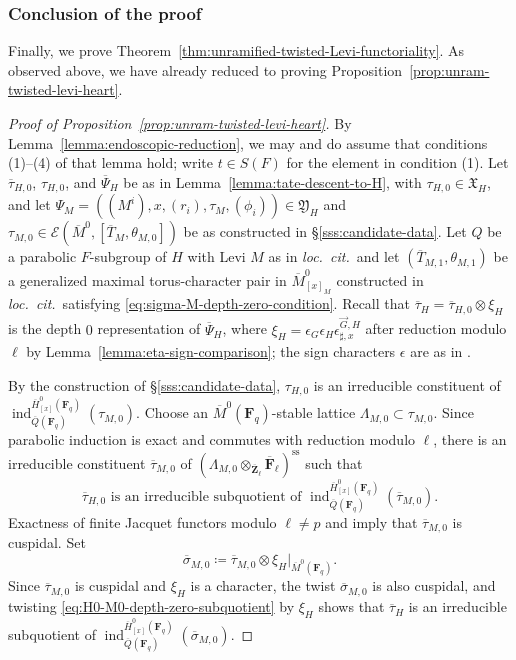 \documentclass[reqno]{amsart}
\numberwithin{equation}{subsection}
\newcommand{\F}{\mathbf{F}}
\newcommand{\Z}{\mathbf{Z}}
\newcommand{\ol}[1]{\overline{#1}}
\newcommand\cE{\mathcal{E}}
\DeclareMathOperator{\ind}{ind}
\theoremstyle{remark}
\numberwithin{equation}{subsection}
\numberwithin{figure}{subsection}
\begin{document}
\subsubsection{Conclusion of the proof}

Finally, we prove Theorem~\ref{thm:unramified-twisted-Levi-functoriality}. As observed above, we have already reduced to proving Proposition~\ref{prop:unram-twisted-levi-heart}.

\begin{proof}[Proof of Proposition~\ref{prop:unram-twisted-levi-heart}]
By Lemma~\ref{lemma:endoscopic-reduction}, we may and do assume that conditions (1)--(4) of that lemma hold; write $t \in S(F)$ for the element in condition (1). Let $\ol\tau_{H,0}$, $\tau_{H,0}$, and $\ol\Psi_H$ be as in Lemma~\ref{lemma:tate-descent-to-H}, with $\tau_{H,0} \in \mathfrak X_H$, and let $\Psi_M = ((M^i), x, (r_i), \tau_M, (\phi_i)) \in \mathfrak{Y}_H$ and $\tau_{M,0} \in \cE(\ol M^0, [\ol T_M, \theta_{M,0}])$ be as constructed in \S\ref{sss:candidate-data}. Let $Q$ be a parabolic $F$-subgroup of $H$ with Levi $M$ as in \textit{loc.\ cit.}\ and let $(\ol T_{M,1}, \theta_{M,1})$ be a generalized maximal torus-character pair in $\ol M^0_{[x]_M}$ constructed in \textit{loc.\ cit.}\ satisfying \eqref{eq:sigma-M-depth-zero-condition}. Recall that $\ol\tau_H = \ol\tau_{H,0} \otimes \xi_H$ is the depth $0$ representation of $\ol\Psi_H$, where $\xi_H = \epsilon_G\epsilon_H\epsilon_{\sharp,x}^{\vec{G},H}$ after reduction modulo $\ell$ by Lemma~\ref{lemma:eta-sign-comparison}; the sign characters $\epsilon$ are as in \cite[\S\S 3.3 and 6.5]{CF26a}.

By the construction of \S\ref{sss:candidate-data}, $\tau_{H,0}$ is an irreducible constituent of $\ind_{\ol Q(\F_q)}^{\ol H^0_{[x]}(\F_q)}
(\tau_{M,0})$.
Choose an $\ol M^0(\F_q)$-stable lattice $\Lambda_{M,0}\subset\tau_{M,0}$. Since parabolic induction is exact and commutes with reduction modulo $\ell$, there is an irreducible constituent $\ol\tau_{M,0}$ of $\left(\Lambda_{M,0}\otimes_{\ol\Z_\ell}\ol\F_\ell\right)^{\mathrm{ss}}$ such that
\begin{equation}\label{eq:H0-M0-depth-zero-subquotient}
\ol\tau_{H,0}
\text{ is an irreducible subquotient of }
\ind_{\ol Q(\F_q)}^{\ol H^0_{[x]}(\F_q)}
(\ol\tau_{M,0}).
\end{equation}
Exactness of finite Jacquet functors modulo $\ell\neq p$ and \cite[Lemma~2.10.1]{Cot26b} imply that $\ol\tau_{M,0}$ is cuspidal. Set
\begin{equation}\label{eq:twisted-M-cuspidal-input}
\ol\sigma_{M,0}\coloneqq
\ol\tau_{M,0}\otimes\xi_H|_{\ol M^0(\F_q)} .
\end{equation}
Since $\ol\tau_{M,0}$ is cuspidal and $\xi_H$ is a character, the twist $\ol\sigma_{M,0}$ is also cuspidal, and twisting \eqref{eq:H0-M0-depth-zero-subquotient} by $\xi_H$ shows that $\ol\tau_H$ is an irreducible subquotient of $\ind_{\ol Q(\F_q)}^{\ol H^0_{[x]}(\F_q)}(\ol\sigma_{M,0})$.


\end{proof}
\end{document}
